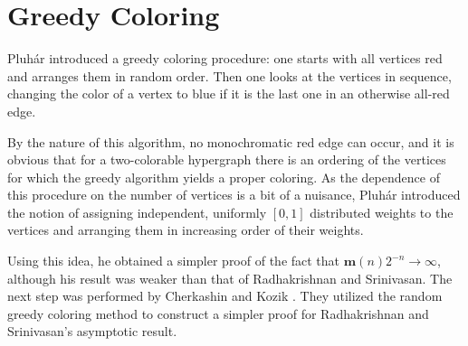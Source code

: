 \documentclass[a4paper,12pt]{article}
\begin{document}
\section{Greedy Coloring}

Pluhár \cite{pluhar} introduced a greedy coloring procedure: one starts with all
vertices red and arranges them in random order. Then one looks at the vertices
in sequence, changing the color of a vertex to blue if it is the last one in 
an otherwise all-red edge. 

By the nature of this algorithm, no monochromatic red edge can occur, and it is
obvious that for a two-colorable hypergraph  there is an ordering of the
vertices for which the greedy algorithm yields a proper coloring.
As the dependence of this procedure on the number of vertices is a bit of a
nuisance, Pluhár \cite{pluhar} introduced the notion of assigning independent, 
uniformly $[0,1]$
distributed weights to the vertices and arranging them in
increasing order of their weights. 

Using this idea, he obtained a simpler proof of the fact that $\mathbf m(n)2^{-n}\to
\infty$, although his result was weaker than that of Radhakrishnan and
Srinivasan.
The next step was performed by Cherkashin and Kozik \cite{cherk}. 
They utilized the random greedy coloring  method 
to construct a simpler proof for Radhakrishnan and Srinivasan's 
asymptotic 
result.
\end{document}
